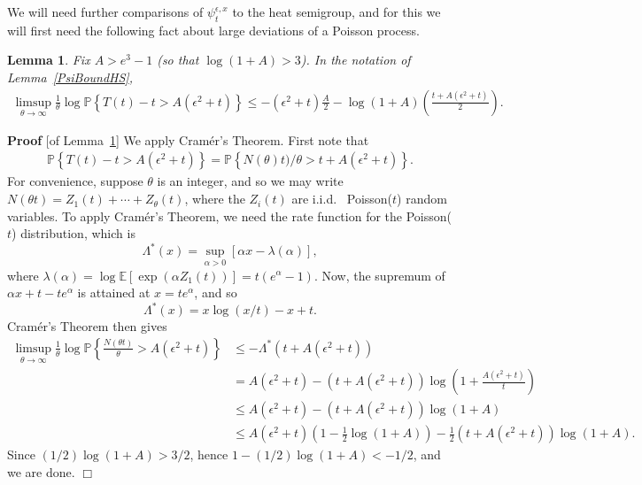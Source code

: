 \documentclass[12pt]{article}
\newenvironment {proof}{{\noindent\bf Proof }}{\hfill $\Box$ \medskip}
\newtheorem{lemma}[theorem]{Lemma}
\newcommand{\IP}{\mathbb P}
\newcommand{\IE}{\mathbb E}
\begin{document}
We will need further comparisons of $\psi_t^{\epsilon,x}$ to the heat semigroup,
and for this we will first need the following fact about large deviations
of a Poisson process.

\begin{lemma}
    \label{lem:poisson_ld}
    Fix $A > e^3 - 1$ (so that $\log(1 + A) > 3$).
    In the notation of Lemma~\ref{PsiBoundHS},
    \begin{align*}
        \limsup_{\theta \to \infty}
        \frac{1}{\theta} \log
        \IP\left\{
            T(t) - t > A(\epsilon^2 + t)
        \right\}
    \le
        - (\epsilon^2 + t) \frac{A}{2}
        - \log(1 + A)\left( \frac{t + A(\epsilon^2 + t)}{2} \right) .
    \end{align*}
\end{lemma}

\begin{proof}[of Lemma~\ref{lem:poisson_ld}]
    We apply Cram\'er's Theorem.
    First note that
    \begin{align*}
        \IP\left\{
            T(t) - t > A(\epsilon^2 + t)
        \right\}
        =
        \IP\left\{
            N(\theta) t) / \theta
            >
            t + A(\epsilon^2 + t)
        \right\} .
    \end{align*}
    For convenience, suppose $\theta$ is an integer,
    and so we may write $N(\theta t) = Z_1(t) + \cdots + Z_\theta(t)$,
    where the $Z_i(t)$ are i.i.d.~ Poisson($t$) random variables.
    To apply Cram\'er's Theorem, we need the rate function for the Poisson($t$) distribution,
    which is
    \[
        \Lambda^*(x) = \sup_{\alpha > 0} \left[ \alpha x - \lambda(\alpha) \right],
    \]
    where $\lambda(\alpha) = \log \IE[\exp(\alpha Z_1(t))] = t(e^\alpha - 1)$.
    Now, the supremum of $\alpha x + t - te^\alpha$ is attained at $x = t e^\alpha$,
    and so
    \[
        \Lambda^*(x) = x \log(x/t) - x + t .
    \]
    Cram\'er's Theorem then gives
    \begin{align*}
        \limsup_{\theta \to \infty}
        \frac{1}{\theta} \log
        \IP\left\{
            \frac{N(\theta t)}{\theta}
            > A(\epsilon^2 + t)
        \right\}
    &\le
        - \Lambda^*(t + A(\epsilon^2 + t))
    \\ &=
        A(\epsilon^2 + t)
        -
        (t + A(\epsilon^2 + t)) \log\left( 1 + \frac{A(\epsilon^2 + t)}{t} \right) 
    \\ &\le
        A(\epsilon^2 + t)
        -
        (t + A(\epsilon^2 + t)) \log(1 + A)
    \\ &\le
        A(\epsilon^2 + t) \left( 1 - \frac{1}{2} \log(1 + A) \right)
        -
        \frac{1}{2} (t + A(\epsilon^2 + t)) \log(1 + A)  .
    \end{align*}
    Since $(1/2) \log(1 + A) > 3/2$, hence $1 - (1/2) \log(1 + A) < - 1/2$,
    and we are done.
\end{proof}
\end{document}
